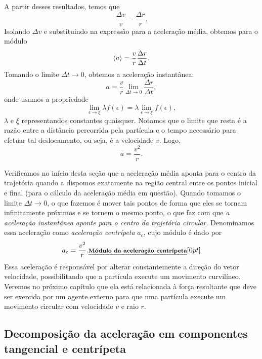 A partir desses resultados, temos que
\begin{equation}
    \frac{\Delta v}{v} = \frac{\Delta r}{r}.
\end{equation}
%
Isolando $\Delta v$ e substituindo na expressão para a aceleração média, obtemos para o módulo
\begin{equation}
  \left\langle{a}\right\rangle = \frac{v}{r} \frac{\Delta r}{\Delta t}.
\end{equation}
%
Tomando o limite $\Delta t \to 0$, obtemos a aceleração instantânea:
\begin{equation}
  a = \frac{v}{r} \lim_{\Delta t \to 0} \frac{\Delta r}{\Delta t},
\end{equation}
%
onde usamos a propriedade
\begin{equation}
    \lim_{\epsilon \to \xi} \lambda f(\epsilon) = \lambda \lim_{\epsilon\to \xi} f(\epsilon),
\end{equation}
%
$\lambda$ e $\xi$ representandos constantes quaisquer. Notamos que o limite que resta é a razão entre a distância percorrida pela partícula e o tempo necessário para efetuar tal deslocamento, ou seja, é a velocidade $v$. Logo,
\begin{equation}
  a = \frac{v^2}{r}.
\end{equation}

Verificamos no início desta seção que a aceleração média aponta para o centro da trajetória quando a dispomos exatamente na região central entre os pontos inicial e final (para o cálculo da aceleração média em questão). Quando tomamos o limite $\Delta t \to 0$, o que fazemos é mover tais pontos de forma que eles se tornam infinitamente próximos e se tornem o mesmo ponto, o que faz com que \emph{a aceleração instantânea aponte para o centro da trajetória circular}. Denominamos essa aceleração como \emph{aceleração centrípeta} $a_c$, cujo módulo é dado por
\begin{equation}\label{Eq:AceleracaoCentripeta}
  a_c = \frac{v^2}{r}. \relax{\footnotesize\emph{\textbf{Módulo da aceleração centrípeta}}}[0pt]
\end{equation}
%
Essa aceleração é responsável por alterar constantemente a direção do vetor velocidade, possibilitando que a partícula execute um movimento curvilíneo. Veremos no próximo capítulo que ela está relacionada à força resultante que deve ser exercida por um agente externo para que uma partícula execute um movimento circular com velocidade $v$ e raio $r$.

\subsection{Decomposição da aceleração em componentes tangencial e centrípeta}

